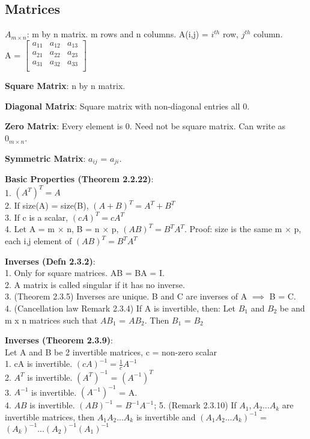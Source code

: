 \documentclass[a4paper,landscape]{article}
\newcommand{\rntopic}[1]{\vspace{-2.0em}\subsection*{#1}\vspace{-1.0em}}
\newcommand{\rnname}[1]{\textbf{#1}}
\begin{document}
\begin{multicols*}{4}
\begin{flatitemize}
\end{flatitemize}

\rntopic{Matrices}

\begin{flatitemize}

\item \rnname{$A_{m \times n}$}: m by n matrix. m rows and n columns. A(i,j) = $i^{th}$ row, $j^{th}$ column. \\
A = 
$\begin{bmatrix}
    a_{11} & a_{12} & a_{13} \\
    a_{21} & a_{22} & a_{23} \\
    a_{31} & a_{32} & a_{33} \\
\end{bmatrix}$
\item \rnname{Square Matrix}: n by n matrix. 
\item \rnname{Diagonal Matrix}: Square matrix with non-diagonal entries all 0.
\item \rnname{Zero Matrix}: Every element is 0. Need not be square matrix. Can write as \textbf{$0_{m \times n}$}.
\item \rnname{Symmetric Matrix}: $a_{ij}$ = $a_{ji}$.

\item \rnname{Basic Properties (Theorem 2.2.22)}:\\
1. $(A^{T})^{T} = A$\\
2. If size(A) = size(B), $(A+B)^T = A^T + B^T$\\
3. If c is a scalar, $(cA)^T = cA^T$\\
4. Let A = m $\times$ n, B = n $\times$ p, $(AB)^T = B^T A^T$. Proof: size is the same m $\times$ p, each i,j element of $(AB)^T = B^T A^T$
\item \rnname{Inverses (Defn 2.3.2)}:\\
1. Only for square matrices. AB = BA = I.\\
2. A matrix is called singular if it has no inverse.\\
3. (Theorem 2.3.5) Inverses are unique. B and C are inverses of A $\implies$ B = C.\\
4. (Cancellation law Remark 2.3.4) If A is invertible, then: Let $B_{1}$ and $B_{2}$ be and m x n matrices such that $AB_{1}$ = $AB_{2}$. Then $B_{1}$ = $B_{2}$ 

\item \rnname{Inverses (Theorem 2.3.9)}:\\
Let A and B be 2 invertible matrices, c = non-zero scalar\\
1. cA is invertible. $(cA)^{-1} = \frac{1}{c}A^{-1}$\\
2. $A^T$ is invertible. $(A^T)^{-1}$ = $(A^{-1})^{T}$\\
3. $A^{-1}$ is invertible. $(A^{-1})^{-1}$ = A.\\
4. $AB$ is invertible. $(AB)^{-1}$ = $B^{-1} A^{-1}$;
5. (Remark 2.3.10) If $A_{1}, A_{2} ... A_{k}$ are invertible matrices, then $A_{1}A_{2}...A_{k}$ is invertible and $(A_{1}A_{2}...A_{k})^{-1}$ = $(A_{k})^{-1}...(A_{2})^{-1}(A_{1})^{-1}$


\end{flatitemize}
\end{multicols*}
\end{document}

